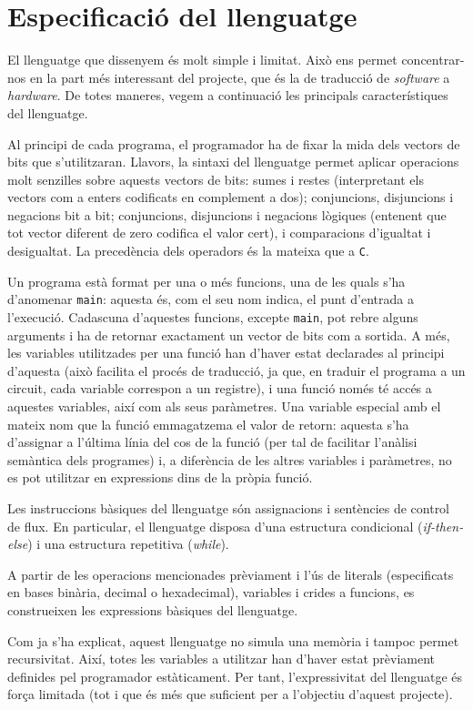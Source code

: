 
\section{Especificació del llenguatge}

El llenguatge que dissenyem és molt simple i limitat. Això ens 
permet concentrar-nos en la part més interessant del projecte, que és la de 
traducció de \textit{software} a \textit{hardware}. De totes maneres, vegem 
a continuació les principals característiques del llenguatge.

Al principi de cada programa, el programador ha de fixar la mida dels vectors 
de bits que s'utilitzaran. Llavors, la sintaxi del llenguatge permet aplicar 
operacions molt senzilles sobre aquests vectors de bits: sumes i restes 
(interpretant els vectors com a enters codificats en complement a dos); 
conjuncions, disjuncions i negacions bit a bit; conjuncions, disjuncions i 
negacions lògiques (entenent que tot vector diferent de zero codifica el valor 
cert), i comparacions d'igualtat i desigualtat. La precedència dels operadors 
és la mateixa que a \texttt{C}.

Un programa està format per una o més funcions, una de les quals s'ha 
d'anomenar \texttt{main}: aquesta és, com el seu nom indica, el punt 
d'entrada a l'execució. Cadascuna d'aquestes funcions, excepte \texttt{main}, 
pot rebre alguns arguments i ha de retornar exactament un vector de bits com 
a sortida. A més, les variables utilitzades per una funció han d'haver estat 
declarades al principi d'aquesta (això facilita el procés de traducció, ja 
que, en traduir el programa a un circuit, cada variable correspon a un 
registre), i una funció només té accés a aquestes variables, així com als seus 
paràmetres. Una variable especial amb el mateix nom que la funció 
emmagatzema el valor de retorn: aquesta s'ha d'assignar a l'última línia del 
cos de la funció (per tal de facilitar l'anàlisi semàntica dels programes) i, 
a diferència de les altres variables i paràmetres, no es pot utilitzar en 
expressions dins de la pròpia funció. 

Les instruccions bàsiques del llenguatge són assignacions i sentències de 
control de flux. En particular, el llenguatge disposa d'una estructura 
condicional (\textit{if-then-else}) i una estructura repetitiva 
(\textit{while}). 

A partir de les operacions mencionades prèviament i l'ús de literals 
(especificats en bases binària, decimal o hexadecimal), variables i crides a 
funcions, es construeixen les expressions bàsiques del llenguatge.

Com ja s'ha explicat, aquest llenguatge no simula una memòria i tampoc permet 
recursivitat. Així, totes les variables a utilitzar han d'haver estat 
prèviament definides pel programador estàticament. Per tant, l'expressivitat 
del llenguatge és força limitada (tot i que és més que suficient per a 
l'objectiu d'aquest projecte).


